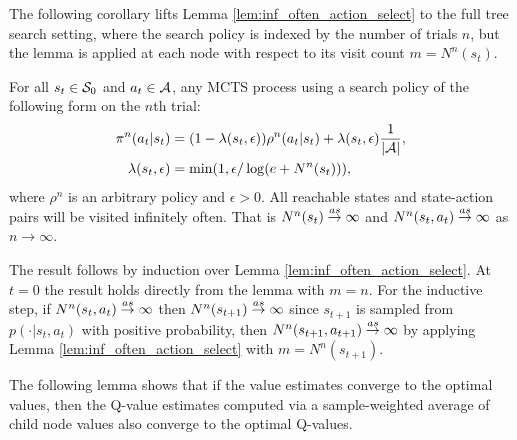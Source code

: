     The following corollary lifts Lemma \ref{lem:inf_often_action_select} to the full tree search setting, where the search policy is indexed by the number of trials $n$, but the lemma is applied at each node with respect to its visit count $m=N^n(s_t)$.

    \begin{corollary} 
        \label{cor:inf_often_visit_node}
        For all $s_t\in\mathcal{S}_0$ and $a_t\in\mathcal{A}$, any MCTS process using a search policy of the following form on the $n$th trial:
        \begin{align}
            \pi^n(a_t|s_t)&=(1-\lambda(s_t,\epsilon))\rho^n(a_t|s_t) + \lambda(s_t,\epsilon) \frac{1}{|\mathcal{A}|}, \\
            \lambda(s_t,\epsilon) &= \min(1,\epsilon/\log(e+N^n(s_t))),
        \end{align}
        where $\rho^n$ is an arbitrary policy and $\epsilon > 0$. All reachable states and state-action pairs will be visited infinitely often. That is $N^n(s_t)\overset{as}{\to}\infty$ and $N^n(s_t,a_t)\overset{as}{\to}\infty$ as $n\rightarrow\infty$.
    \end{corollary}
    \begin{proofoutline}
        The result follows by induction over Lemma \ref{lem:inf_often_action_select}. At $t=0$ the result holds directly from the lemma with $m=n$. For the inductive step, if $N^n(s_t,a_t)\overset{as}{\to}\infty$ then $N^n(s_{t+1})\overset{as}{\to}\infty$ since $s_{t+1}$ is sampled from $p(\cdot|s_t,a_t)$ with positive probability, then $N^n(s_{t+1},a_{t+1})\overset{as}{\to}\infty$ by applying Lemma \ref{lem:inf_often_action_select} with $m=N^n(s_{t+1})$.
    \end{proofoutline}

    \proofsep



    The following lemma shows that if the value estimates converge to the optimal values, then the Q-value estimates computed via a sample-weighted average of child node values also converge to the optimal Q-values. 


